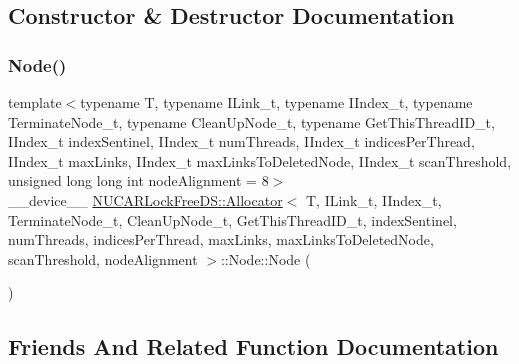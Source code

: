 \subsection{Constructor \& Destructor Documentation}
\mbox{\label{class_n_u_c_a_r_lock_free_d_s_1_1_allocator_1_1_node_ac6eeee00317554695aed9e4657d222d7}} 
\subsubsection{\texorpdfstring{Node()}{Node()}}
{\footnotesize\ttfamily template$<$typename T, typename I\+Link\+\_\+t, typename I\+Index\+\_\+t, typename Terminate\+Node\+\_\+t, typename Clean\+Up\+Node\+\_\+t, typename Get\+This\+Thread\+I\+D\+\_\+t, I\+Index\+\_\+t index\+Sentinel, I\+Index\+\_\+t num\+Threads, I\+Index\+\_\+t indices\+Per\+Thread, I\+Index\+\_\+t max\+Links, I\+Index\+\_\+t max\+Links\+To\+Deleted\+Node, I\+Index\+\_\+t scan\+Threshold, unsigned long long int node\+Alignment = 8$>$ \\
\+\_\+\+\_\+device\+\_\+\+\_\+ \mbox{\hyperlink{class_n_u_c_a_r_lock_free_d_s_1_1_allocator}{N\+U\+C\+A\+R\+Lock\+Free\+D\+S\+::\+Allocator}}$<$ T, I\+Link\+\_\+t, I\+Index\+\_\+t, Terminate\+Node\+\_\+t, Clean\+Up\+Node\+\_\+t, Get\+This\+Thread\+I\+D\+\_\+t, index\+Sentinel, num\+Threads, indices\+Per\+Thread, max\+Links, max\+Links\+To\+Deleted\+Node, scan\+Threshold, node\+Alignment $>$\+::Node\+::\+Node (\begin{DoxyParamCaption}{ }\end{DoxyParamCaption})\hspace{0.3cm}{\ttfamily [inline]}}



\subsection{Friends And Related Function Documentation}
\mbox{\label{class_n_u_c_a_r_lock_free_d_s_1_1_allocator_1_1_node_a4580c3239c67ddcfdafff4feae0d9b1d}} 
